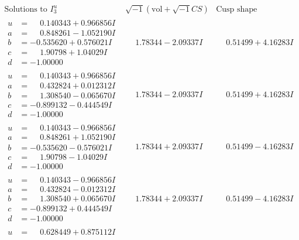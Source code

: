 \documentclass[1p]{elsarticle_modified}
\theoremstyle{definition}
\newcommand{\I}{\sqrt{-1}}
\begin{document}
$$\begin{array}{c|c|c}  
\text{Solutions to }I^u_{3}& \I (\text{vol} + \sqrt{-1}CS) & \text{Cusp shape}\\
 \hline 
\begin{aligned}
u &= \phantom{-}0.140343 + 0.966856 I \\
a &= \phantom{-}0.848261 - 1.052190 I \\
b &= -0.535620 + 0.576021 I \\
c &= \phantom{-}1.90798 + 1.04029 I \\
d &= -1.00000\phantom{ +0.000000I}\end{aligned}
 & \phantom{-}1.78344 - 2.09337 I & \phantom{-}0.51499 + 4.16283 I \\ \hline\begin{aligned}
u &= \phantom{-}0.140343 + 0.966856 I \\
a &= \phantom{-}0.432824 + 0.012312 I \\
b &= \phantom{-}1.308540 - 0.065670 I \\
c &= -0.899132 - 0.444549 I \\
d &= -1.00000\phantom{ +0.000000I}\end{aligned}
 & \phantom{-}1.78344 - 2.09337 I & \phantom{-}0.51499 + 4.16283 I \\ \hline\begin{aligned}
u &= \phantom{-}0.140343 - 0.966856 I \\
a &= \phantom{-}0.848261 + 1.052190 I \\
b &= -0.535620 - 0.576021 I \\
c &= \phantom{-}1.90798 - 1.04029 I \\
d &= -1.00000\phantom{ +0.000000I}\end{aligned}
 & \phantom{-}1.78344 + 2.09337 I & \phantom{-}0.51499 - 4.16283 I \\ \hline\begin{aligned}
u &= \phantom{-}0.140343 - 0.966856 I \\
a &= \phantom{-}0.432824 - 0.012312 I \\
b &= \phantom{-}1.308540 + 0.065670 I \\
c &= -0.899132 + 0.444549 I \\
d &= -1.00000\phantom{ +0.000000I}\end{aligned}
 & \phantom{-}1.78344 + 2.09337 I & \phantom{-}0.51499 - 4.16283 I \\ \hline\begin{aligned}
u &= \phantom{-}0.628449 + 0.875112 I \\

\end{aligned}
\end{array}$$
\end{document}
